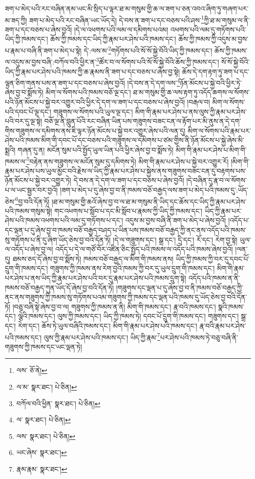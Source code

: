 ཟག་པ་མེད་པའི་རང་བཞིན་ནམ་ཡང་མི་སྲིད་པ་ལྟར་ཐ་མ་གསུམ་གྱི་ཆ་ལ་ཟག་པ་ཅན་འབའ་ཞིག་ཏུ་གཞག་པར་མ་ཟད་ཀྱི། ཟག་པ་མེད་པའི་རང་བཞིན་ཡང་ཡོད་དེ། དེ་བས་ན་ཟག་པ་དང་བཅས་པའི་ཤས་\footnote{ལས་  ཅོ་ནེ། }ཀྱི་ཐ་མ་གསུམ་ལ་ནི་ཟག་པ་དང་བཅས་པ་ཞེས་བྱའོ། །དེ་ལ་འཕགས་པའི་ལམ་ལ་དམིགས་པའམ། འཕགས་པའི་ལམ་དུ་གཏོགས་པའི་ཡིད་ཀྱི་ཁམས་དང་། ཆོས་ཀྱི་ཁམས་དང་ཡིད་ཀྱི་རྣམ་པར་ཤེས་པའི་ཁམས་དང་། ཆོས་ཀྱི་ཁམས་ཀྱི་འདུས་མ་བྱས་པ་རྣམ་པ་བཞི་ནི་ཟག་པ་མེད་པ་སྟེ། དེ་:ལས་མ་\footnote{ལ་མ་  སྣར་ཐང་།  པེ་ཅིན། }གཏོགས་པའི་སོ་སོ་སྐྱེ་བོའི་ཡིད་ཀྱི་ཁམས་དང་། ཆོས་ཀྱི་ཁམས་ལ་འདུས་མ་བྱས་བཞི་:བཀོལ་བའི་ཕྱིར་ན་\footnote{བཀོལ་བའི་ཕྱིན་  སྣར་ཐང་།  པེ་ཅིན། }ཚོར་བ་ལ་སོགས་པའི་སོ་སོ་སྐྱེ་བོའི་ཆོས་ཀྱི་ཁམས་དང་། སོ་སོ་སྐྱེ་བོའི་ཡིད་ཀྱི་རྣམ་པར་ཤེས་པའི་ཁམས་ཀྱི་ཆ་རྣམས་ནི་ཟག་པ་དང་བཅས་པ་ཞེས་བྱ་སྟེ། ཆོས་དེ་དག་རྟག་ཏུ་ཟག་པ་དང་ལྷན་ཅིག་གནས་པས་ན་ཟག་པ་དང་བཅས་པ་ཞེས་བྱའོ། །དེ་བས་ན་དེ་དག་ལས་\footnote{ལ་  སྣར་ཐང་།  པེ་ཅིན། }ཉོན་མོངས་པ་སྐྱེ་བའི་ཕྱིར་ཏེ་ཞེས་བྱ་བ་སྨོས་ཏེ། མིག་ལ་སོགས་པའི་ཁམས་བཅོ་ལྔ་དང་། ཐ་མ་གསུམ་གྱི་ཆ་ལས་རྟག་ཏུ་འདོད་ཆགས་ལ་སོགས་པའི་ཉོན་མོངས་པ་སྐྱེ་བར་འགྱུར་བའི་ཕྱིར་དེ་དག་ལ་ཟག་པ་དང་བཅས་པ་ཞེས་བྱའོ། །བརྒལ་བ། མིག་ལ་སོགས་པའི་དབང་པོ་ལྔ་དང་། གཟུགས་ལ་སོགས་པའི་ཡུལ་ལྔ་དང་། མིག་གི་རྣམ་པར་ཤེས་པ་ནས་ལུས་ཀྱི་རྣམ་པར་ཤེས་པའི་བར་དུ་ལྔ་སྟེ། བཅོ་ལྔ་ནི་བླུན་པོའི་རང་བཞིན་ཡིན་པས་གཟུགས་བཟང་ངན་ལ་རྟོག་པར་མི་ནུས་ན་དེ་དག་གིས་གཟུགས་ལ་དམིགས་ནས་ཇི་ལྟར་ཉོན་མོངས་པ་སྐྱེ་བར་འགྱུར་ཞེས་པའི་ལན་དུ། མིག་ལ་སོགས་པའི་རྣམ་པར་ཤེས་པའི་ཁམས་མིག་གི་དབང་པོ་དང་བཅས་པའི་གཟུགས་ལ་དམིགས་པ་ཙམ་གྱིས་ནི་ཉོན་མོངས་པ་སྐྱེ་ཞེས་མི་སྨྲའི། གཞན་དུ་ན། མངོན་སུམ་པའི་སྤྱོད་ཡུལ་ཡིན་པའི་ཕྱིར་ཞེས་བྱ་བ་སྨོས་ཏེ། མིག་གི་རྣམ་པར་ཤེས་པ་མིག་གི་ཁམས་ལ་\footnote{ལས་  སྣར་ཐང་།  པེ་ཅིན། }བརྟེན་ནས་གཟུགས་ལ་མངོན་སུམ་དུ་དམིགས་ཏེ། མིག་གི་རྣམ་པར་ཤེས་པ་སྐྱེ་བར་འགྱུར་རོ། །མིག་གི་རྣམ་པར་ཤེས་པས་ཡུལ་མྱོང་བའི་རྗེས་ལ་ཡིད་ཀྱི་རྣམ་པར་ཤེས་པ་སྐྱེས་ནས་གཟུགས་བཟང་ངན་དུ་བརྟགས་པས་ཉོན་མོངས་པ་སྐྱེ་བར་འགྱུར་ཏེ། དེ་བས་ན་དེ་དག་ལ་ཟག་པ་དང་བཅས་པ་ཞེས་བྱའོ། །དེ་བཞིན་དུ་རྣ་བ་ལ་སོགས་པ་ལ་ཡང་སྦྱར་བར་བྱའོ། །ཟག་པ་མེད་པ་དུ་ཞེས་བྱ་བ་ནི་ཁམས་བཅོ་བརྒྱད་ལས་ཟག་པ་མེད་པའི་ཁམས་དུ་:ཡོད་ཅེས་\footnote{ཡང་ཞེས་  སྣར་ཐང་། }བྱ་བའི་དོན་ཏོ། །ཐ་མ་གསུམ་གྱི་ཆའོ་ཞེས་བྱ་བ་ལ་ཐ་མ་གསུམ་ནི་ཡིད་དང་ཆོས་དང་ཡིད་ཀྱི་རྣམ་པར་ཤེས་པའི་ཁམས་གསུམ་སྟེ། གང་འཕགས་པ་སློབ་པ་དང་མི་སློབ་པ་རྣམས་ཀྱི་ཡིད་ཀྱི་ཁམས་དང་། ཡིད་ཀྱི་རྣམ་པར་ཤེས་པའི་ཁམས་འཕགས་པའི་ལམ་དུ་གཏོགས་པ་དང་། འདུས་མ་བྱས་བཞི་ནི་ཟག་པ་མེད་པ་ཞེས་བྱའོ། །འདོད་པ་དང་ལྡན་པ་དུ་ཞེས་བྱ་བ་ཁམས་བཅོ་བརྒྱད་བཤད་པ་ཡིན་པས་ཁམས་བཅོ་བརྒྱད་ཀྱི་ནང་ནས་འདོད་པའི་ཁམས་སུ་གཏོགས་པ་ནི་དུ་ཞིག་ཡོད་ཅེས་བྱ་བའི་དོན་ཏོ། །དེ་ལ་གཟུགས་དང་། སྒྲ་དང་། དྲི་དང་། རོ་དང་། རེག་བྱ་སྟེ། ཡུལ་ལ་འདོད་པ་ཞེས་བྱ་ལ། འདོད་པ་དེ་ལ་གཙོ་བོར་འཛིན་ཅིང་སྤྱོད་པའི་ཁམས་ལ་འདོད་པའི་ཁམས་ཞེས་བྱའོ། །ལན་དུ། ཐམས་ཅད་དོ་ཞེས་བྱ་བ་སྨོས་ཏེ། ཁམས་བཅོ་བརྒྱད་ལ་མིག་གི་ཁམས་ནས། ཡིད་ཀྱི་ཁམས་ཀྱི་བར་དུ་དབང་པོ་དྲུག་གི་ཁམས་དང་། གཟུགས་ཀྱི་ཁམས་ནས་རེག་བྱའི་ཁམས་ཀྱི་བར་དུ་ཡུལ་དྲུག་གི་ཁམས་དང་། མིག་གི་རྣམ་པར་ཤེས་པ་ནས་ཡིད་ཀྱི་རྣམ་པར་ཤེས་པའི་བར་དུ་རྣམ་པར་ཤེས་པའི་ཁམས་དྲུག་སྟེ། འདོད་པའི་ཁམས་ན་ནི་ཁམས་བཅོ་བརྒྱད་ཀུན་ཡོད་དོ་ཞེས་བྱ་བའི་དོན་ཏོ། །གཟུགས་དང་ལྡན་པ་དུ་ཞེས་བྱ་བ་ནི་ཁམས་བཅོ་བརྒྱད་ཀྱི་ནང་ནས་གཟུགས་ཀྱི་ཁམས་སུ་གཏོགས་པའམ་གཟུགས་ཀྱི་ཁམས་དང་ལྡན་པའི་ཁམས་དུ་ཡོད་ཅེས་བྱ་བའི་དོན་ཏོ། །བཅུ་བཞི་སྟེ་ཞེས་བྱ་བ་ལ། གཟུགས་ཀྱི་ཁམས་ན་ནི། མིག་གི་ཁམས་དང་། རྣ་བའི་ཁམས་དང་། སྣའི་ཁམས་དང་། ལྕེའི་ཁམས་དང་། ལུས་ཀྱི་ཁམས་དང་། ཡིད་ཀྱི་ཁམས་ཏེ། དབང་པོ་དྲུག་གི་ཁམས་དང་། གཟུགས་དང་། སྒྲ་དང་། རེག་དང་། ཆོས་ཏེ་ཡུལ་བཞིའི་ཁམས་དང་། མིག་གི་རྣམ་པར་ཤེས་པའི་ཁམས་དང་། རྣ་བའི་རྣམ་པར་ཤེས་པའི་ཁམས་དང་། ལུས་ཀྱི་རྣམ་པར་ཤེས་པའི་ཁམས་དང་། ཡིད་ཀྱི་རྣམ་\footnote{རྣམ་རྣམ་  སྣར་ཐང་། }པར་ཤེས་པའི་ཁམས་ཏེ་བཅུ་བཞི་ནི་གཟུགས་ཀྱི་ཁམས་དང་ཡང་ལྡན་ཏེ། 